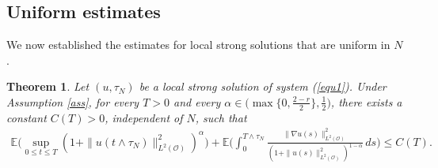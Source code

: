 \documentclass[reqno, 11pt]{amsart}
\newtheorem{thm}{Theorem}
\theoremstyle{definition}
\numberwithin{equation}{section} \numberwithin{lem}{section}
\numberwithin{thm}{section} \numberwithin{prop}{section}
\numberwithin{cor}{section} \numberwithin{rem}{section}
\numberwithin{defn}{section}
\begin{document}
\subsection{Uniform estimates}  We  now  established the estimates  for local strong solutions that are uniform in $N$.
  \begin{thm}\label{thm_estimate}
      Let $(u,\tau_N)$ be a local strong solution  of  system (\ref{equ1}). Under Assumption \ref{ass},  for every $T>0$ and every $\alpha\in\big(\max\{0,\frac{2-r}{2}\},\frac{1}{2}\big)$, there exists a constant $C(T)>0$, independent of $N$, such that 
      \begin{align}\label{est_C(T)}
	    \mathbb E\Big(\sup_{0\le t\le T}(1+\|u(t\wedge\tau_N)\|_{L^2(\mathcal{O})}^2)^\alpha\Big)+\mathbb{E}\Big(\int_0^{T\wedge{\tau_N}}
		\frac{\|\nabla u(s)\|_{L^2(\mathcal{O})}^2}{(1+\|u(s)\|_{L^2(\mathcal{O})}^2)^{1-\alpha}}\,ds\Big)
	\le C(T).
	\end{align}
  \end{thm} 
\end{document}
